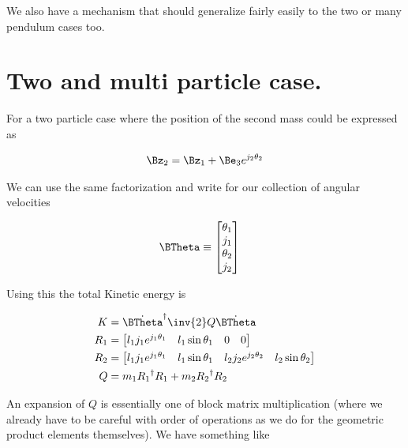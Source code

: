 We also have a mechanism that should generalize fairly easily to the two or many pendulum cases too.

\section{Two and multi particle case.}

For a two particle case where the position of the second mass could be expressed as

\begin{align}\label{eqn:sPolarMultiPendulum:zoo11a}
\Bz_2 = \Bz_1 + \Be_3 e^{j_2 \theta_2}
\end{align}

We can use the same factorization and write for our collection of angular velocities

\begin{align}\label{eqn:sPolarMultiPendulum:zoo11}
\BTheta &\equiv
\begin{bmatrix}
\theta_1 \\ j_1 \\
\theta_2 \\ j_2 \\
\end{bmatrix} 
\end{align}

Using this the total Kinetic energy is

\begin{align}\label{eqn:sPolarMultiPendulum:zoo12}
K &= {\dot{\BTheta}}^\dagger \inv{2} Q \dot{\BTheta} \\
R_1 &=
\begin{bmatrix}
l_1 j_1 e^{j_1\theta_1} & 
l_1 \sin\theta_1 &
0 &
0
\end{bmatrix} \\
R_2 &=
\begin{bmatrix}
 l_1 j_1 e^{j_1\theta_1} & 
 l_1 \sin\theta_1 &
 l_2 j_2 e^{j_2\theta_2} & 
 l_2 \sin\theta_2 
\end{bmatrix} \\
Q &=
m_1 {R_1}^\dagger R_1
+m_2 {R_2}^\dagger R_2
\end{align}

An expansion of $Q$ is essentially one of block matrix multiplication (where we already have to be careful with order of operations as we do for the geometric product elements themselves).  We have something like

